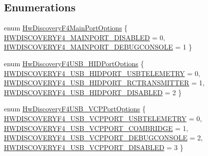 \subsection*{\-Enumerations}
\begin{DoxyCompactItemize}
\item 
enum \hyperlink{group___hw_discovery_f4_ga1edc66a8b4b08b49e308422ad2c5a75a}{\-Hw\-Discovery\-F4\-Main\-Port\-Options} \{ \hyperlink{group___hw_discovery_f4_gga1edc66a8b4b08b49e308422ad2c5a75aacff005c7fdf860f646edc5f0c5535015}{\-H\-W\-D\-I\-S\-C\-O\-V\-E\-R\-Y\-F4\-\_\-\-M\-A\-I\-N\-P\-O\-R\-T\-\_\-\-D\-I\-S\-A\-B\-L\-E\-D} = 0, 
\hyperlink{group___hw_discovery_f4_gga1edc66a8b4b08b49e308422ad2c5a75aace6c2d16fb62bcebc30af666768cd8d3}{\-H\-W\-D\-I\-S\-C\-O\-V\-E\-R\-Y\-F4\-\_\-\-M\-A\-I\-N\-P\-O\-R\-T\-\_\-\-D\-E\-B\-U\-G\-C\-O\-N\-S\-O\-L\-E} = 1
 \}
\item 
enum \hyperlink{group___hw_discovery_f4_ga361bdd010cdeee2cf7577b6b527d800d}{\-Hw\-Discovery\-F4\-U\-S\-B\-\_\-\-H\-I\-D\-Port\-Options} \{ \hyperlink{group___hw_discovery_f4_gga361bdd010cdeee2cf7577b6b527d800da9d59687e2a1f274c05b10d859bf238d9}{\-H\-W\-D\-I\-S\-C\-O\-V\-E\-R\-Y\-F4\-\_\-\-U\-S\-B\-\_\-\-H\-I\-D\-P\-O\-R\-T\-\_\-\-U\-S\-B\-T\-E\-L\-E\-M\-E\-T\-R\-Y} = 0, 
\hyperlink{group___hw_discovery_f4_gga361bdd010cdeee2cf7577b6b527d800da59d466736314d96b795d0d6d8bf9df74}{\-H\-W\-D\-I\-S\-C\-O\-V\-E\-R\-Y\-F4\-\_\-\-U\-S\-B\-\_\-\-H\-I\-D\-P\-O\-R\-T\-\_\-\-R\-C\-T\-R\-A\-N\-S\-M\-I\-T\-T\-E\-R} = 1, 
\hyperlink{group___hw_discovery_f4_gga361bdd010cdeee2cf7577b6b527d800dad2a3ba5cbc2e4b81798ba0353a14ae69}{\-H\-W\-D\-I\-S\-C\-O\-V\-E\-R\-Y\-F4\-\_\-\-U\-S\-B\-\_\-\-H\-I\-D\-P\-O\-R\-T\-\_\-\-D\-I\-S\-A\-B\-L\-E\-D} = 2
 \}
\item 
enum \hyperlink{group___hw_discovery_f4_ga7eb9d69716cc1b29af3779863539aa83}{\-Hw\-Discovery\-F4\-U\-S\-B\-\_\-\-V\-C\-P\-Port\-Options} \{ \hyperlink{group___hw_discovery_f4_gga7eb9d69716cc1b29af3779863539aa83a16fbba02be82c13100df0519c39e3ef9}{\-H\-W\-D\-I\-S\-C\-O\-V\-E\-R\-Y\-F4\-\_\-\-U\-S\-B\-\_\-\-V\-C\-P\-P\-O\-R\-T\-\_\-\-U\-S\-B\-T\-E\-L\-E\-M\-E\-T\-R\-Y} = 0, 
\hyperlink{group___hw_discovery_f4_gga7eb9d69716cc1b29af3779863539aa83a58bc829d4e2f9f16cf937146b4bc74d1}{\-H\-W\-D\-I\-S\-C\-O\-V\-E\-R\-Y\-F4\-\_\-\-U\-S\-B\-\_\-\-V\-C\-P\-P\-O\-R\-T\-\_\-\-C\-O\-M\-B\-R\-I\-D\-G\-E} = 1, 
\hyperlink{group___hw_discovery_f4_gga7eb9d69716cc1b29af3779863539aa83a3cc39e8bee27c2fd8d1abb6ddc3533dc}{\-H\-W\-D\-I\-S\-C\-O\-V\-E\-R\-Y\-F4\-\_\-\-U\-S\-B\-\_\-\-V\-C\-P\-P\-O\-R\-T\-\_\-\-D\-E\-B\-U\-G\-C\-O\-N\-S\-O\-L\-E} = 2, 
\hyperlink{group___hw_discovery_f4_gga7eb9d69716cc1b29af3779863539aa83afe68e0f78c4a51fd23aad84f16633f41}{\-H\-W\-D\-I\-S\-C\-O\-V\-E\-R\-Y\-F4\-\_\-\-U\-S\-B\-\_\-\-V\-C\-P\-P\-O\-R\-T\-\_\-\-D\-I\-S\-A\-B\-L\-E\-D} = 3
 \}
\end{DoxyCompactItemize}

